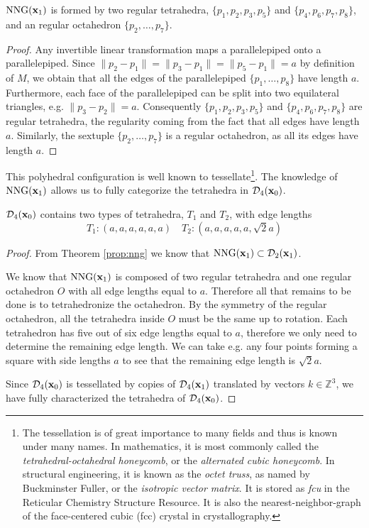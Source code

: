 \begin{lemma}
	$\mathrm{NNG}({\mathbf{x}}_1)$ is formed by two regular tetrahedra, $\{p_1,p_2,p_3,p_5\}$ and $\{p_4,p_6,p_7,p_8\}$, and an regular octahedron $\{p_2,\dots,p_7\}$.
\end{lemma}
\begin{proof}
	Any invertible linear transformation maps a parallelepiped onto a parallelepiped. Since $\|p_2 - p_1\| = \|p_3-p_1\| = \|p_5-p_1\|=a$ by definition of $M$, we obtain that all the edges of the parallelepiped $\{p_1,\dots,p_8\}$ have length $a$. Furthermore, each face of the parallelepiped can be split into two equilateral triangles, e.g. $\|p_3-p_2\|=a$. Consequently $\{p_1,p_2,p_3,p_5\}$ and $\{p_4,p_6,p_7,p_8\}$ are regular tetrahedra, the regularity coming from the fact that all edges have length $a$. Similarly, the sextuple $\{p_2,\dots,p_7\}$ is a regular octahedron, as all its edges have length $a$.
\end{proof}

This polyhedral configuration is well known to tessellate\footnote{ The tessellation is of great importance to many fields and thus is known under many names. In mathematics, it is most commonly called the \textit{tetrahedral-octahedral honeycomb}, or the \textit{alternated cubic honeycomb}. In structural engineering, it is known as the \textit{octet truss}, as named by Buckminster Fuller, or the \textit{isotropic vector matrix}. It is stored as \textit{fcu} in the Reticular Chemistry Structure Resource\cite{RCSR}. It is also the nearest-neighbor-graph of the face-centered cubic (fcc) crystal in crystallography\cite{Gabbrielli12}.  }. The knowledge of $\mathrm{NNG}({\mathbf{x}}_1)$ allows us to fully categorize the tetrahedra in $\mathcal D_4({\mathbf{x}}_0)$.

\begin{proposition}\label{prop:tetraInTess} $\mathcal D_4({\mathbf{x}}_0)$ contains two types of tetrahedra, $T_1$ and $T_2$, with edge lengths
$$T_1: (a,a,a,a,a,a) \quad T_2:(a,a,a,a,a,\sqrt 2a)$$
\end{proposition}
\begin{proof}
From Theorem \ref{prop:nng} we know that $\mathrm{NNG}({\mathbf{x}}_1) \subset \mathcal D_2({\mathbf{x}}_1)$. 

We know that $\text{NNG}({\mathbf{x}}_1)$ is composed of two regular tetrahedra and one regular octahedron $O$ with all edge lengths equal to $a$. Therefore all that remains to be done is to tetrahedronize the octahedron. By the symmetry of the regular octahedron, all the tetrahedra inside $O$ must be the same up to rotation. Each tetrahedron has five out of six edge lengths equal to $a$, therefore we only need to determine the remaining edge length. We can take e.g. any four points forming a square with side lengths $a$ to see that the remaining edge length is $\sqrt 2a$.

Since $\mathcal D_4({\mathbf{x}}_0)$ is tessellated by copies of $\mathcal D_4({\mathbf{x}}_1)$ translated by vectors $k\in\mathbb Z^3$, we have fully characterized the tetrahedra of $\mathcal D_4({\mathbf{x}}_0)$. 
\end{proof}

